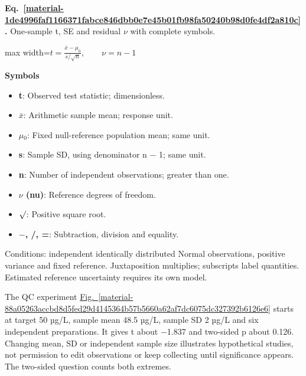 \documentclass[11pt,a4paper]{article}
\begin{document}
\medskip

\par\medskip
\noindent\begin{minipage}{\linewidth}
\label{material-1de4996faf1166371fabce846dbb0e7e45b01fb98fa50240b98d0fe4df2a810c}
\noindent\textbf{Eq.~\ref*{material-1de4996faf1166371fabce846dbb0e7e45b01fb98fa50240b98d0fe4df2a810c}.} One-sample t, SE and residual \ensuremath{\nu} with complete symbols.\par\nopagebreak
\begin{center}\begin{adjustbox}{max width=\linewidth}$\displaystyle t=\frac{\bar x-\mu_0}{s/\sqrt n},\qquad \nu=n-1$\end{adjustbox}\end{center}

\par\noindent\textbf{Symbols}

\begin{itemize}\setlength{\itemsep}{1pt}\setlength{\parsep}{0pt}
\item \textbf{t}: Observed test statistic; dimensionless.
\item \textbf{\ensuremath{\bar{x}}}: Arithmetic sample mean; response unit.
\item \textbf{\ensuremath{\mu}\ensuremath{{}_0}}: Fixed null-reference population mean; same unit.
\item \textbf{s}: Sample SD, using denominator n \ensuremath{-} 1; same unit.
\item \textbf{n}: Number of independent observations; greater than one.
\item \textbf{\ensuremath{\nu} (nu)}: Reference degrees of freedom.
\item \textbf{\ensuremath{\sqrt{\vphantom{x}}}}: Positive square root.
\item \textbf{\ensuremath{-}, /, =}: Subtraction, division and equality.
\end{itemize}

Conditions: independent identically distributed Normal observations, positive variance and fixed reference. Juxtaposition multiplies; subscripts label quantities. Estimated reference uncertainty requires its own model.

\end{minipage}\par
\medskip

The QC experiment \hyperref[material-88a05263accbd8d5fed29d4145364b57b5660a62af7dc6075dc327392b6126e6]{Fig.~\ref*{material-88a05263accbd8d5fed29d4145364b57b5660a62af7dc6075dc327392b6126e6}} starts at target 50 µg/L, sample mean 48.5 µg/L, sample SD 2 µg/L and six independent preparations. It gives t about \ensuremath{-}1.837 and two-sided p about 0.126. Changing mean, SD or independent sample size illustrates hypothetical studies, not permission to edit observations or keep collecting until significance appears. The two-sided question counts both extremes.
\end{document}
